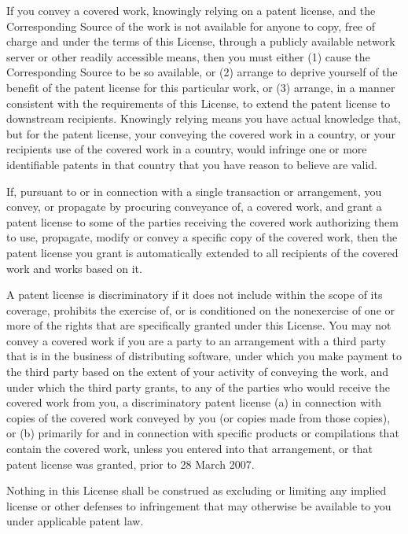 \documentclass[a4paper,10pt,english]{sphinxmanual}
\begin{document}
\begin{sphinxVerbatim}[commandchars=\\\{\}]
  If you convey a covered work, knowingly relying on a patent license,
and the Corresponding Source of the work is not available for anyone
to copy, free of charge and under the terms of this License, through a
publicly available network server or other readily accessible means,
then you must either (1) cause the Corresponding Source to be so
available, or (2) arrange to deprive yourself of the benefit of the
patent license for this particular work, or (3) arrange, in a manner
consistent with the requirements of this License, to extend the patent
license to downstream recipients.  \PYGZdq{}Knowingly relying\PYGZdq{} means you have
actual knowledge that, but for the patent license, your conveying the
covered work in a country, or your recipient\PYGZsq{}s use of the covered work
in a country, would infringe one or more identifiable patents in that
country that you have reason to believe are valid.

  If, pursuant to or in connection with a single transaction or
arrangement, you convey, or propagate by procuring conveyance of, a
covered work, and grant a patent license to some of the parties
receiving the covered work authorizing them to use, propagate, modify
or convey a specific copy of the covered work, then the patent license
you grant is automatically extended to all recipients of the covered
work and works based on it.

  A patent license is \PYGZdq{}discriminatory\PYGZdq{} if it does not include within
the scope of its coverage, prohibits the exercise of, or is
conditioned on the non\PYGZhy{}exercise of one or more of the rights that are
specifically granted under this License.  You may not convey a covered
work if you are a party to an arrangement with a third party that is
in the business of distributing software, under which you make payment
to the third party based on the extent of your activity of conveying
the work, and under which the third party grants, to any of the
parties who would receive the covered work from you, a discriminatory
patent license (a) in connection with copies of the covered work
conveyed by you (or copies made from those copies), or (b) primarily
for and in connection with specific products or compilations that
contain the covered work, unless you entered into that arrangement,
or that patent license was granted, prior to 28 March 2007.

  Nothing in this License shall be construed as excluding or limiting
any implied license or other defenses to infringement that may
otherwise be available to you under applicable patent law.


\end{sphinxVerbatim}
\end{document}
